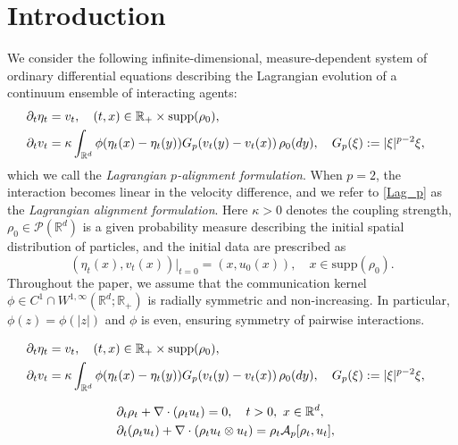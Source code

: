 \documentclass[10pt,a4paper]{amsart}
\newcommand{\R}{\mathbb R}
\newcommand{\bq}{\begin{equation}}
\newcommand{\calA}{\mathcal A}
\newcommand{\calP}{\mathcal P}
\newcommand{\dy}{\textnormal{d}y}
\newcommand{\eq}{\end{equation}}
\newcommand{\intr}{\int_{\R^d}}
\newcommand{\pa}{\partial}
\newcommand{\supp}{\text{supp}}
\begin{document}
\section{Introduction}%
We consider the following infinite-dimensional, measure-dependent system of ordinary differential equations describing the Lagrangian evolution of a continuum ensemble of interacting agents:
\begin{align}\label{Lag_p}
\begin{aligned}
\pa_t \eta_t &= v_t, \quad (t,x) \in \R_+ \times \supp(\rho_0),\cr
\pa_t v_t &=\kappa \intr \phi(\eta_t(x) - \eta_t(y)) G_p(v_t(y) - v_t(x))\,\rho_0(\dy), \quad  G_p(\xi):=|\xi|^{p-2}\xi,
\end{aligned}
\end{align}
which we call the \emph{Lagrangian $p$-alignment formulation}. When $p=2$, the interaction becomes linear in the velocity difference, and we refer to \eqref{Lag_p} as the \emph{Lagrangian alignment formulation}. Here $\kappa>0$ denotes the coupling strength, $\rho_0 \in \calP(\R^d)$ is a given probability measure describing the initial spatial distribution of particles, and the initial data are prescribed as
\bq\label{ini:Lag_p}
(\eta_t(x), v_t(x))|_{t=0} = (x, u_0(x)), \quad x \in \supp(\rho_0).
\eq
Throughout the paper, we assume that the communication kernel $\phi \in C^1 \cap W^{1,\infty}(\R^d;\R_+)$ is radially symmetric and non-increasing. In particular, $\phi(z)=\phi(|z|)$ and $\phi$ is even, ensuring symmetry of
pairwise interactions.

\begin{align}
\begin{aligned}
\pa_t \eta_t &= v_t, \quad (t,x) \in \R_+ \times \supp(\rho_0),\cr
\pa_t v_t &=\kappa \intr \phi(\eta_t(x) - \eta_t(y)) G_p(v_t(y) - v_t(x))\,\rho_0(\dy), \quad  G_p(\xi):=|\xi|^{p-2}\xi,
\end{aligned}
\end{align}

\begin{align}\label{EA}
\begin{aligned}
&\pa_t \rho_t + \nabla \cdot (\rho_t u_t) = 0, \quad t>0, \ x \in \R^d, \cr
&\pa_t (\rho_t u_t) + \nabla \cdot (\rho_t u_t \otimes u_t) = \rho_t\calA_p[\rho_t,u_t],
\end{aligned}
\end{align}
\end{document}
